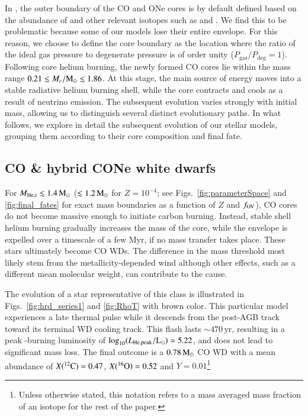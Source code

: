\documentclass[main.tex]{subfiles}
\begin{document}
In \mesa, the outer boundary of the CO and ONe cores is by default defined based on the abundance of  and other relevant isotopes such as  and . We find this to be problematic because some of our models lose their entire  envelope. For this reason, we choose to define the core boundary as the location where the ratio of the ideal gas pressure to degenerate 
pressure is of  order  unity ($P_{\text{gas}} / P_{\text{deg}} = 1$).
Following  core helium burning, the newly formed CO cores lie within the mass range $0.21 
\lesssim M_c/\rm M_\odot \lesssim 1.86$. 
At this stage, the main source of energy moves into a stable radiative helium burning shell, while 
the core contracts and cools as a result of neutrino emission. The subsequent evolution varies 
strongly with initial mass, allowing us to distinguish several distinct evolutionary paths. In what follows, 
we explore in detail the subsequent evolution of our \seriesone stellar models, grouping them 
according to their core composition and final fate. 



\subsection{CO \& hybrid CONe white dwarfs}\label{sec:ch2:wd_evolution}
For $M_{\rm{He, i}}\lesssim 1.4\msun$ 
($\lesssim1.2\msun$ for $Z=10^{-4}$;  see 
Figs.~\ref{fig:parameterSpace} and \ref{fig:final_fates}  for 
exact mass boundaries as a function of $Z$ and $f_{\rm OV}$), CO cores do not become massive enough 
to initiate carbon burning. Instead, stable shell helium burning gradually increases the mass of the core, while the envelope is expelled over a timescale of a few Myr, if no mass transfer takes place. These stars ultimately become CO WDs. The difference in the mass threshold most likely stem from the metallicity-depended wind although other effects, such as a different mean molecular weight, can contribute to the cause.

The evolution of a star representative of this class is 
illustrated in Figs.~\ref{fig:hrd_series1} and \ref{fig:RhoT} with brown color.  
This particular model experiences a late thermal pulse  
while it descends from the post-AGB 
track toward its terminal WD cooling track. This 
flash lasts $\sim 470\,\text{yr}$, resulting in a peak -burning luminosity of 
$\log_{10}(L_{\rm He, peak}/{\rm L}_\odot) \simeq 5.22$, and does not lead to significant mass loss. The final outcome is a $0.78\msun$ CO WD  with a mean abundance of $X(\iso{C}{12}) = 0.47$, $X(\iso{O}{16}) = 0.52$ and $Y = 0.01$\footnote{Unless otherwise stated, this notation refers to a mass averaged mass fraction of an isotope for the rest of the paper.}
\end{document}
